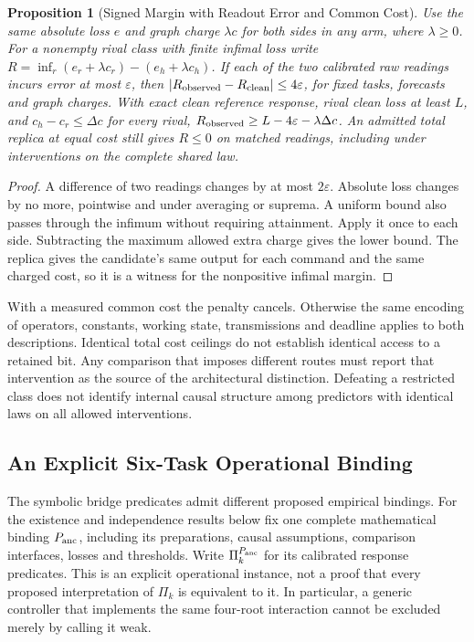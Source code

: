\documentclass[11pt,a4paper]{article}
\newtheorem{proposition}[theorem]{Proposition}
\theoremstyle{definition}
\begin{document}
\begin{proposition}[Signed Margin with Readout Error and Common Cost]
\label{prop:late-transcript-noise-margin}
Use the same absolute loss $e$ and graph charge $\lambda c$ for both sides
in any arm, where $\lambda\ge0$. For a nonempty rival class with finite
infimal loss write
$R=\inf_r(e_r+\lambda c_r)-(e_h+\lambda c_h)$.
If each of the two calibrated raw readings incurs error at most $\varepsilon$,
then $|R_{\rm observed}-R_{\rm clean}|\le4\varepsilon$, for fixed tasks,
forecasts and graph charges. With exact clean reference response, rival clean
loss at least $L$, and $c_h-c_r\le\Delta c$ for every rival,
$R_{\rm observed}\ge L-4\varepsilon-\lambda\Delta c$.
An admitted total replica at equal cost still gives $R\le0$ on matched
readings, including under interventions on the complete shared law.
\end{proposition}

\begin{proof}
A difference of two readings changes by at most $2\varepsilon$. Absolute
loss changes by no more, pointwise and under averaging or suprema.
A uniform bound also passes through the infimum without requiring
attainment. Apply it once to each side. Subtracting the maximum allowed
extra charge gives the lower bound. The replica gives the candidate's
same output for each command and the same charged cost, so it is a
witness for the nonpositive infimal margin.
\end{proof}

With a measured common cost the penalty cancels. Otherwise the same
encoding of operators, constants, working state, transmissions and
deadline applies to both descriptions. Identical total cost ceilings
do not establish identical access to a retained bit. Any comparison
that imposes different routes must report that intervention as the
source of the architectural distinction. Defeating a restricted class
does not identify internal causal structure among predictors with
identical laws on all allowed interventions.

\subsection{An Explicit Six-Task Operational Binding}

The symbolic bridge predicates admit different proposed empirical bindings.
For the existence and independence results below fix one complete mathematical
binding $P_{\rm anc}$, including its preparations, causal assumptions,
comparison interfaces, losses and thresholds. Write $\Pi_k^{P_{\rm anc}}$
for its calibrated response predicates. This is an explicit operational
instance, not a proof that every proposed interpretation of $\Pi_k$ is
equivalent to it. In particular, a generic controller that implements the
same four-root interaction cannot be excluded merely by calling it weak.
\end{document}
